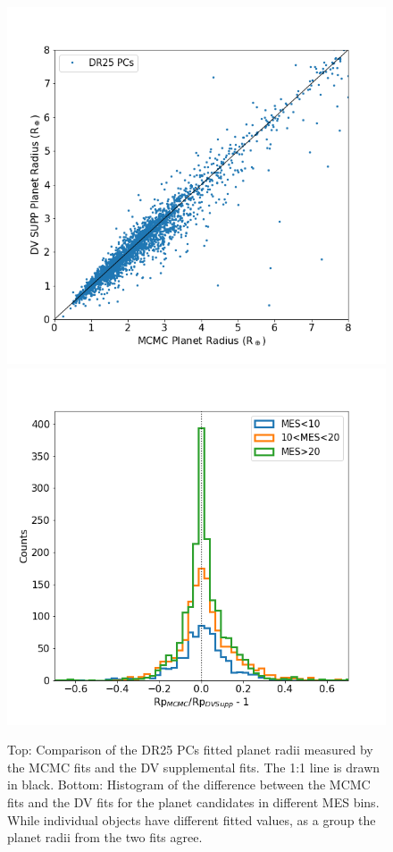 \begin{figure}[h]
\centering
\includegraphics[width=0.99\linewidth]{fig-comparePradius-mcmcSup.png}
\includegraphics[width=0.99\linewidth]{fig-comparePradius-histogram.png}
\caption{Top: Comparison of the DR25 PCs fitted planet radii measured by the MCMC fits and the DV supplemental fits. The 1:1 line is drawn in black. Bottom: Histogram of the difference between the MCMC fits and the DV fits for the planet candidates in different MES bins. While individual objects have different fitted values, as a group the planet radii from the two fits agree. }
\label{f:mcmcsupp}
\end{figure}


